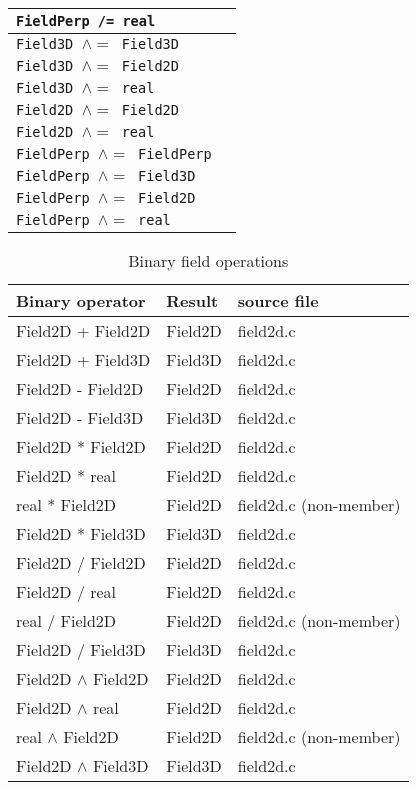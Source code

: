 \documentclass[12pt, a4paper]{article}
\newcommand{\code}[1]{\texttt{#1}}
\newcommand{\pow}{\ensuremath{\wedge} }
\newcommand{\poweq}{\ensuremath{\wedge =} }
\begin{document}
\begin{table}[h]
\begin{tabular}[]{ll}
\code{FieldPerp /= real} & \\
\hline
\code{Field3D \poweq Field3D} & \\
\code{Field3D \poweq Field2D} & \\
\code{Field3D \poweq real} & \\
\code{Field2D \poweq Field2D} & \\
\code{Field2D \poweq real} & \\
\code{FieldPerp \poweq FieldPerp} & \\
\code{FieldPerp \poweq Field3D} & \\
\code{FieldPerp \poweq Field2D} & \\
\code{FieldPerp \poweq real} & \\
\hline
\hline
\end{tabular}
\end{table}

\begin{table}[h]
\centering
\caption{Binary field operations} \label{tab:field_bop}
\begin{tabular}[]{lll}
\hline
\hline
Binary operator & Result & source file \\
\hline
Field2D + Field2D  & Field2D & field2d.c \\
Field2D + Field3D  & Field3D & field2d.c \\
\hline
Field2D - Field2D  & Field2D & field2d.c \\
Field2D - Field3D  & Field3D & field2d.c \\
\hline
Field2D * Field2D  & Field2D & field2d.c \\
Field2D * real     & Field2D & field2d.c \\
real * Field2D     & Field2D & field2d.c (non-member) \\
Field2D * Field3D  & Field3D & field2d.c \\
\hline
Field2D / Field2D  & Field2D & field2d.c \\
Field2D / real     & Field2D & field2d.c \\
real / Field2D     & Field2D & field2d.c (non-member) \\
Field2D / Field3D  & Field3D & field2d.c \\
\hline
Field2D \pow  Field2D & Field2D & field2d.c \\
Field2D \pow real    & Field2D & field2d.c \\
real \pow Field2D    & Field2D & field2d.c (non-member) \\
Field2D \pow Field3D & Field3D & field2d.c \\
\hline
\hline
\end{tabular}
\end{table}
\end{document}
